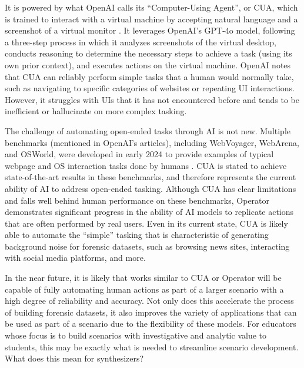 \documentclass[letterpaper,12pt]{report}
\begin{document}
It is powered by what OpenAI calls its ``Computer-Using Agent'', or CUA,
which is trained to interact with a virtual machine by accepting natural
language and a screenshot of a virtual monitor
\cite{openaiComputerUsingAgent2025}. It leverages OpenAI's GPT-4o
model, following a three-step process in which it analyzes screenshots
of the virtual desktop, conducts reasoning to determine the necessary
steps to achieve a task (using its own prior context), and executes
actions on the virtual machine. OpenAI notes that CUA can reliably
perform simple tasks that a human would normally take, such as
navigating to specific categories of websites or repeating UI
interactions. However, it struggles with UIs that it has not encountered
before and tends to be inefficient or hallucinate on more complex
tasking.

The challenge of automating open-ended tasks through AI is not new.
Multiple benchmarks (mentioned in OpenAI's articles), including
WebVoyager, WebArena, and OSWorld, were developed in early 2024 to
provide examples of typical webpage and OS interaction tasks done by
humans
\cite{zhouWebArenaRealisticWeb2024,heWebVoyagerBuildingEndtoEnd2024,xieOSWorldBenchmarkingMultimodal2024}.
CUA is stated to achieve state-of-the-art results in these benchmarks,
and therefore represents the current ability of AI to address open-ended
tasking. Although CUA has clear limitations and falls well behind human
performance on these benchmarks, Operator demonstrates significant
progress in the ability of AI models to replicate actions that are often
performed by real users. Even in its current state, CUA is likely able
to automate the ``simple'' tasking that is characteristic of generating
background noise for forensic datasets, such as browsing news sites,
interacting with social media platforms, and more.

In the near future, it is likely that works similar to CUA or Operator
will be capable of fully automating human actions as part of a larger
scenario with a high degree of reliability and accuracy. Not only does
this accelerate the process of building forensic datasets, it also
improves the variety of applications that can be used as part of a
scenario due to the flexibility of these models. For educators whose
focus is to build scenarios with investigative and analytic value to
students, this may be exactly what is needed to streamline scenario
development. What does this mean for synthesizers?
\end{document}
